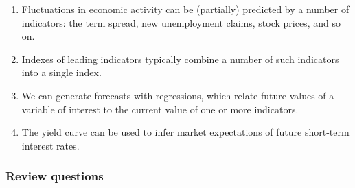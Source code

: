 \documentclass[letterpaper,12pt]{article}
\begin{document}
\begin{enumerate}
\item Fluctuations in economic activity can be (partially)
predicted by a number of indicators:  the term spread, new
unemployment claims, stock prices, and so on.

\item Indexes of leading indicators typically combine a number of
such indicators into a single index.

\item We can generate forecasts with regressions, which relate
future values of a variable of interest to the current value of
one or more indicators.

\item The yield curve can be used to infer market expectations of
future short-term interest rates.

\end{enumerate}


\subsubsection*{Review questions}
\end{document}
